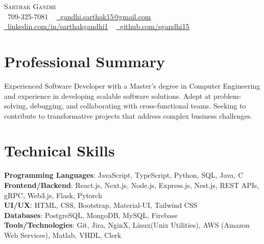 \documentclass[letterpaper,11pt]{article}
\begin{document}
\begin{center}
    {\Huge \scshape Sarthak Gandhi} \\ \vspace{1pt}
    \small \raisebox{-0.1\height}\faPhone\ 709-325-7081 ~ 
    \href{mailto:gandhi.sarthak15@gmail.com}
    {\raisebox{-0.2\height}\faEnvelope\  {\underline{gandhi.sarthak15@gmail.com}}} ~ 
    \href{https://www.linkedin.com/in/sarthakgandhi1/}
    {\raisebox{-0.2\height}\faLinkedin\ {\underline{linkedin.com/in/sarthakgandhi1}}}  ~
    \href{https://github.com/sgandhi15}
    {\raisebox{-0.2\height}\faGithub\ {\underline{github.com/sgandhi15}}}
    \vspace{-8pt}
\end{center}


\section{Professional Summary}
Experienced Software Developer with a Master’s degree in Computer Engineering and experience in developing scalable software solutions. Adept at problem-solving, debugging, and collaborating with cross-functional teams. Seeking to contribute to transformative projects that address complex business challenges.

\vspace{-8pt}

\section{Technical Skills}
\begin{itemize}[leftmargin=0.15in, label={}]
\small{\item{
\textbf{Programming Languages}{: JavaScript, TypeScript, Python, SQL, Java, C} \\
\textbf{Frontend/Backend}{: React.js, Next.js, Node.js, Express.js, Nest.js, REST APIs, gRPC, Web3.js, Flask, Pytorch} \\
\textbf{UI/UX}{: HTML, CSS, Bootstrap, Material-UI, Tailwind CSS} \\
\textbf{Databases}{: PostgreSQL, MongoDB, MySQL, Firebase} \\
\textbf{Tools/Technologies}{: Git, Jira, NginX, Linux(Unix Utilities), AWS (Amazon Web Services), Matlab, VHDL, Clerk} \\
}}
\end{itemize}
\vspace{-16pt}
\end{document}
